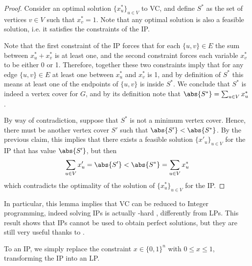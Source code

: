 \documentclass[a4paper, 12pt]{report}
\begin{document}
    \begin{proof}
        Consider an optimal solution $\{x^*_u\}_{u \in V}$ to VC, and define $S^*$ as the set of vertices $v \in V$ such that $x^*_v = 1$. Note that any optimal solution is also a feasible solution, i.e. it satisfies the constraints of the IP.

        Note that the first constraint of the IP forces that for each $\{u, v\} \in E$ the sum between $x^*_u + x^*_v$ is at least one, and the second constraint forces each variable $x_v^*$ to be either 0 or 1. Therefore, together these two constraints imply that for any edge $\{u, v\} \in E$ at least one between $x_u^*$ and $x_v^*$ is 1, and by definition of $S^*$ this means at least one of the endpoints of $\{u, v\}$ is inside $S^*$. We conclude that $S^*$ is indeed a vertex cover for $G$, and by its definition note that $\abs{S^*} = \sum_{u \in V}{x^*_u}$.


        By way of contradiction, suppose that $S^*$ is not a minimum vertex cover. Hence, there must be another vertex cover $S'$ such that $\abs{S'} < \abs{S^*}$. By the previous claim, this implies that there exists a feasible solution $\{x'_u\}_{u \in V}$ for the IP that has value $\abs{S'}$, but then $$\sum_{u \in V}{x'_u} = \abs{S'} < \abs{S^*} = \sum_{u \in V}{x^*_u}$$ which contradicts the optimality of the solution of $\{x^*_u\}_{u \in V}$ for the IP.
    \end{proof}

    In particular, this lemma implies that VC can be reduced to Integer programming, indeed solving IPs is actually \NPclass-hard \cite{karp}, differently from LPs. This result shows that IPs cannot be used  to obtain perfect solutions, but they are still very useful thanks to .

    To  an IP, we simply replace the constraint $x \in \{0, 1\}^n$ with $0 \le x \le 1$, transforming the IP into an LP.
\end{document}
